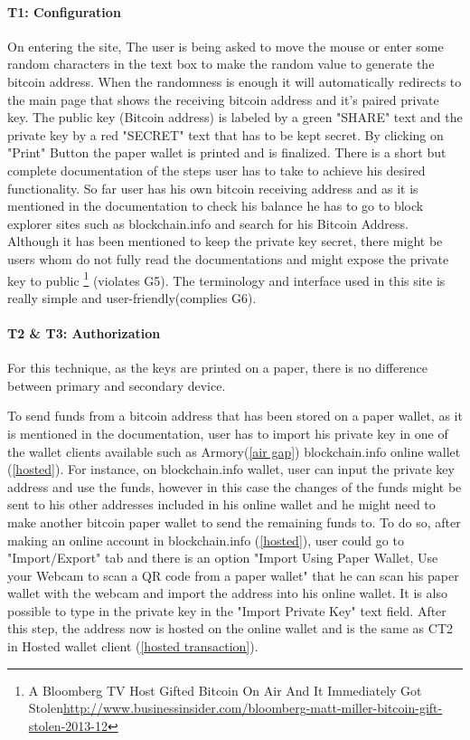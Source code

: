 \paragraph{T1: Configuration} On entering the site, The user is being asked to move the mouse or enter some random characters in the text box to make the random value to generate the bitcoin address. When the randomness is enough it will automatically redirects to the main page that shows the receiving bitcoin address and it's paired private key. The public key (Bitcoin address) is labeled by a green "SHARE" text and the private key by a red "SECRET" text that has to be kept secret. By clicking on "Print" Button the paper wallet is printed and is finalized. There is a short but complete documentation of the steps user has to take to achieve his desired functionality. So far user has his own bitcoin receiving address and as it is mentioned in the documentation to check his balance he has to go to block explorer sites such as blockchain.info and search for his Bitcoin Address. Although it has been mentioned to keep the private key secret, there might be users whom do not fully read the documentations and might expose the private key to public \footnote{A Bloomberg TV Host Gifted Bitcoin On Air And It Immediately Got Stolen\url{http://www.businessinsider.com/bloomberg-matt-miller-bitcoin-gift-stolen-2013-12}} (violates G5). The terminology and interface used in this site is really simple and user-friendly(complies G6).

\paragraph{T2 \& T3: Authorization}

 For this technique, as the keys are printed on a paper, there is no difference between primary and secondary device.
 
To send funds from a bitcoin address that has been stored on a paper wallet, as it is mentioned in the documentation, user has to import his private key in one of the wallet clients available such as Armory(\ref{air gap}) blockchain.info online wallet (\ref{hosted}). For instance, on blockchain.info wallet, user can input the private key address and use the funds, however in this case the changes of the funds might be sent to his other addresses included in his online wallet and he might need to make another bitcoin paper wallet to send the remaining funds to. To do so, after making an online account in blockchain.info (\ref{hosted}), user could go to "Import/Export" tab and there is an option "Import Using Paper Wallet, Use your Webcam to scan a QR code from a paper wallet" that he can scan his paper wallet with the webcam and import the address into his online wallet. It is also possible to type in the private key in the "Import Private Key" text field. After this step, the address now is hosted on the online wallet and is the same as CT2 in Hosted wallet client (\ref{hosted transaction}).

